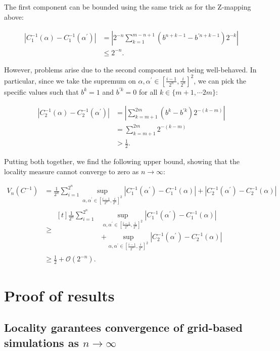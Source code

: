 \documentclass[10pt,letterpaper]{article}
\def\bO{\mathcal{O}}
\begin{document}
The first component can be bounded using the same trick as for the Z-mapping above:

$$
\begin{aligned}
|C^{-1}_1(\alpha) - C^{-1}_1(\alpha^\prime)| &= \left| 2^{-n} \sum_{k=1}^{m-n+1} (b^{n+k-1} - b^{\prime n+k-1}) 2^{-k} \right| \\
&\leq 2^{-n}.
\end{aligned}
$$

However, problems arise due to the second component not being well-behaved. In particular, since we take the supremum on $\alpha,\alpha^\prime \in \left[\tfrac{i-1}{2^n},\tfrac{i}{2^n}\right]^2$, we can pick the specific values such that $b^k=1$ and $b^{\prime k}=0$ for all $k \in \{m+1, \cdots 2m\}$:

$$
\begin{aligned}
|C^{-1}_2(\alpha) - C^{-1}_2(\alpha^\prime)| &= \left| \sum_{k=m+1}^{2m} (b^k - b^{\prime k}) 2^{-(k-m)} \right| \\
&= \sum_{k=m+1}^{2m} 2^{-(k-m)} \\
&> \frac 12.
\end{aligned}
$$

Putting both together, we find the following upper bound, showing that the locality measure cannot converge to zero as $n \to \infty$:

$$
\begin{aligned}
V_n(C^{-1}) &= \frac{1}{2^n}\sum_{i=1}^{2^n} \sup_{\alpha, \alpha^\prime \in \left[\tfrac{i-1}{2^n}, \tfrac{i}{2^n}\right]^2} |C^{-1}_1(\alpha^\prime) - C^{-1}_1(\alpha)| + |C^{-1}_2(\alpha^\prime) - C^{-1}_2(\alpha)| \\
&\geq
\begin{aligned}[t]
	\frac{1}{2^n}\sum_{i=1}^{2^n}&
	\sup_{\alpha, \alpha^\prime \in \left[\tfrac{i-1}{2^n}, \tfrac{i}{2^n}\right]^2} |C^{-1}_1(\alpha^\prime) - C^{-1}_1(\alpha)|\\
	&+ \sup_{\alpha, \alpha^\prime \in \left[\tfrac{i-1}{2^n}, \tfrac{i}{2^n}\right]^2} |C^{-1}_2(\alpha^\prime) - C^{-1}_2(\alpha)|
\end{aligned}\\
&\geq \frac 12 + \bO(2^{-n}).
\end{aligned}
$$

\section{Proof of results}

\subsection{Locality garantees convergence of grid-based simulations as $n \to \infty$}
\end{document}
